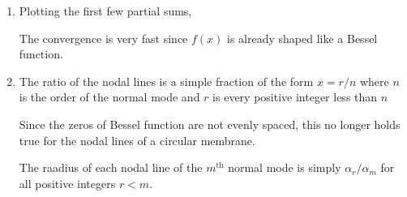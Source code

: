 \begin{enumerate}
\begin{enumerate}
              \item Plotting the first few partial sums,
                    \begin{figure}[H]
                        \centering
                    \end{figure}
                    The convergence is very fast since $ f(x) $ is already shaped like
                    a Bessel function.

              \item The ratio of the nodal lines is a simple fraction of the
                    form $ x = r/n $ where $ n $ is the order of the normal mode and
                    $ r $ is every positive integer less than $ n $ \par
                    Since the zeros of Bessel function are not evenly spaced, this no
                    longer holds true for the nodal lines of a circular membrane. \par
                    The raadius of each nodal line of the $ m^{\text{th}} $ normal
                    mode is simply $ \alpha_r / \alpha_m $ for all positive integers
                    $ r < m $.
          \end{enumerate}


\end{enumerate}
